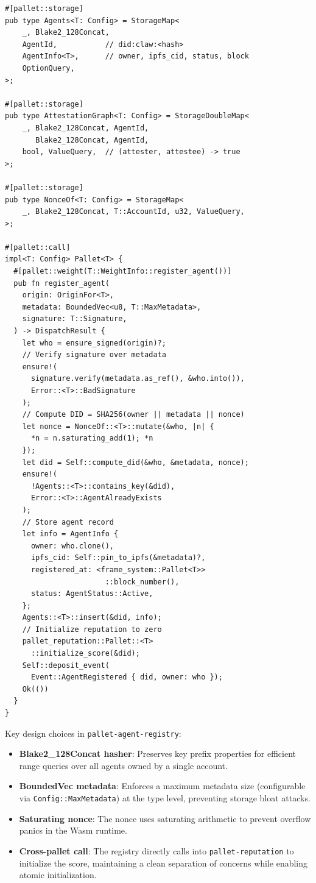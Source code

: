 \documentclass[conference]{IEEEtran}
\begin{document}
\begin{lstlisting}[language=Pseudocode, caption={pallet-agent-registry: storage and registration (Rust/FRAME pseudocode)}, label={lst:registry}, basicstyle=\ttfamily\tiny, frame=single, breaklines=true, xleftmargin=1em, keywordstyle=\color{clawblue}\bfseries, commentstyle=\color{clawgray}]
#[pallet::storage]
pub type Agents<T: Config> = StorageMap<
    _, Blake2_128Concat,
    AgentId,           // did:claw:<hash>
    AgentInfo<T>,      // owner, ipfs_cid, status, block
    OptionQuery,
>;

#[pallet::storage]
pub type AttestationGraph<T: Config> = StorageDoubleMap<
    _, Blake2_128Concat, AgentId,
       Blake2_128Concat, AgentId,
    bool, ValueQuery,  // (attester, attestee) -> true
>;

#[pallet::storage]
pub type NonceOf<T: Config> = StorageMap<
    _, Blake2_128Concat, T::AccountId, u32, ValueQuery,
>;

#[pallet::call]
impl<T: Config> Pallet<T> {
  #[pallet::weight(T::WeightInfo::register_agent())]
  pub fn register_agent(
    origin: OriginFor<T>,
    metadata: BoundedVec<u8, T::MaxMetadata>,
    signature: T::Signature,
  ) -> DispatchResult {
    let who = ensure_signed(origin)?;
    // Verify signature over metadata
    ensure!(
      signature.verify(metadata.as_ref(), &who.into()),
      Error::<T>::BadSignature
    );
    // Compute DID = SHA256(owner || metadata || nonce)
    let nonce = NonceOf::<T>::mutate(&who, |n| {
      *n = n.saturating_add(1); *n
    });
    let did = Self::compute_did(&who, &metadata, nonce);
    ensure!(
      !Agents::<T>::contains_key(&did),
      Error::<T>::AgentAlreadyExists
    );
    // Store agent record
    let info = AgentInfo {
      owner: who.clone(),
      ipfs_cid: Self::pin_to_ipfs(&metadata)?,
      registered_at: <frame_system::Pallet<T>>
                       ::block_number(),
      status: AgentStatus::Active,
    };
    Agents::<T>::insert(&did, info);
    // Initialize reputation to zero
    pallet_reputation::Pallet::<T>
      ::initialize_score(&did);
    Self::deposit_event(
      Event::AgentRegistered { did, owner: who });
    Ok(())
  }
}
\end{lstlisting}

Key design choices in \texttt{pallet-agent-registry}:
\begin{itemize}
    \item \textbf{Blake2\_128Concat hasher}: Preserves key prefix properties for efficient range queries over all agents owned by a single account.
    \item \textbf{BoundedVec metadata}: Enforces a maximum metadata size (configurable via \texttt{Config::MaxMetadata}) at the type level, preventing storage bloat attacks.
    \item \textbf{Saturating nonce}: The nonce uses saturating arithmetic to prevent overflow panics in the Wasm runtime.
    \item \textbf{Cross-pallet call}: The registry directly calls into \texttt{pallet-reputation} to initialize the score, maintaining a clean separation of concerns while enabling atomic initialization.
\end{itemize}
\end{document}
